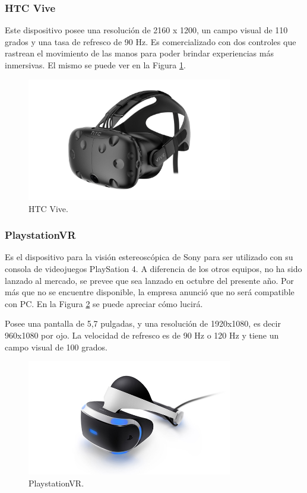 \documentclass[12pt]{article}
\begin{document}
\subsubsection{HTC Vive}
\noindent Este dispositivo posee una resolución de 2160 x 1200, un campo visual de 110 grados y una tasa de refresco de 90 Hz. Es comercializado con dos controles que rastrean el movimiento de las manos para poder brindar experiencias más inmersivas\cite{htcvive}. El mismo se puede ver en la Figura \ref{htcV}.
\begin{figure}[h!]
\includegraphics[width=0.8\textwidth,center]{htc.png}
\caption{HTC Vive.}
\label{htcV}
\end{figure}
\subsubsection{PlaystationVR}
\noindent Es el dispositivo para la visión estereoscópica de Sony para ser utilizado con su consola de videojuegos PlaySation 4. A diferencia de los otros equipos, no ha sido lanzado al mercado, se prevee que sea lanzado en octubre del presente año. Por más que no se encuentre disponible, la empresa anunció que no será compatible con PC. En la Figura \ref{psvr} se puede apreciar cómo lucirá.

Posee una pantalla de 5,7 pulgadas, y una resolución de 1920x1080, es decir 960x1080 por ojo. La velocidad de refresco es de 90 Hz o 120 Hz y tiene un campo visual de 100 grados\cite{psvrspecs}.
\clearpage
\begin{figure}[h!]
\includegraphics[width=0.8\textwidth,center]{psvr.jpg}
\caption{PlaystationVR.}
\label{psvr}
\end{figure}
\end{document}
